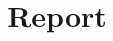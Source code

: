 \documentclass[10pt,conference]{inatel}
\begin{document}
  \title{Report}
  \author
  {
  }

\maketitle

%
%
%
%




%
\end{document}
